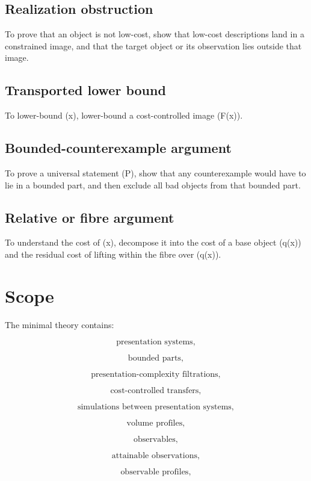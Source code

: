 \documentclass[11pt]{article}
\begin{document}
\subsection*{Realization obstruction}

To prove that an object is not low-cost, show that low-cost descriptions land in a constrained image, and that the target object or its observation lies outside that image.


\subsection*{Transported lower bound}

To lower-bound (x), lower-bound a cost-controlled image (F(x)).


\subsection*{Bounded-counterexample argument}

To prove a universal statement (P), show that any counterexample would have to lie in a bounded part, and then exclude all bad objects from that bounded part.


\subsection*{Relative or fibre argument}

To understand the cost of (x), decompose it into the cost of a base object (q(x)) and the residual cost of lifting within the fibre over (q(x)).


\section{Scope}

The minimal theory contains:

\[
\text{presentation systems},
\]

\[
\text{bounded parts},
\]

\[
\text{presentation-complexity filtrations},
\]

\[
\text{cost-controlled transfers},
\]

\[
\text{simulations between presentation systems},
\]

\[
\text{volume profiles},
\]

\[
\text{observables},
\]

\[
\text{attainable observations},
\]

\[
\text{observable profiles},
\]
\end{document}
